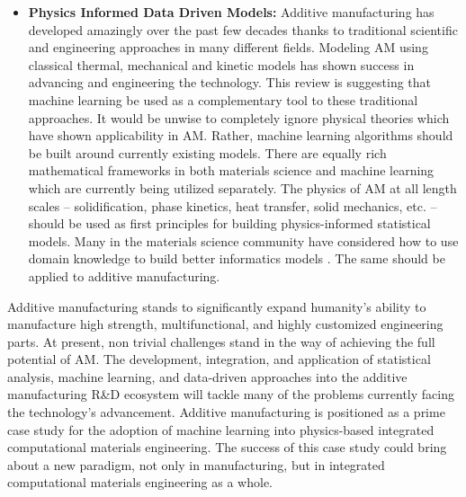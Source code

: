\begin{itemize}
	\item \textbf{Physics Informed Data Driven Models:} Additive manufacturing has developed amazingly over the past few decades thanks to traditional scientific and engineering approaches in many different fields. Modeling AM using classical thermal, mechanical and kinetic models has shown success in advancing and engineering the technology. This review is suggesting that machine learning be used as a complementary tool to these traditional approaches. It would be unwise to completely ignore physical theories which have shown applicability in AM. Rather, machine learning algorithms should be built around currently existing models. There are equally rich mathematical frameworks in both materials science and machine learning which are currently being utilized separately. The physics of AM at all length scales -- solidification, phase kinetics, heat transfer, solid mechanics, etc. -- should be used as first principles for building physics-informed statistical models. Many in the materials science community have considered how to use domain knowledge to build better informatics models \cite{Deaven1995, Morris1996, Wagner2016, Raccuglia2016}. The same should be applied to additive manufacturing.
\end{itemize}

Additive manufacturing stands to significantly expand humanity's ability to manufacture high strength, multifunctional, and highly customized engineering parts. At present, non trivial challenges stand in the way of achieving the full potential of AM. The development, integration, and application of statistical analysis, machine learning, and data-driven approaches into the additive manufacturing R\&D ecosystem will tackle many of the problems currently facing the technology's advancement. Additive manufacturing is positioned as a prime case study for the adoption of machine learning into physics-based integrated computational materials engineering. The success of this case study could bring about a new paradigm, not only in manufacturing, but in integrated computational materials engineering as a whole.